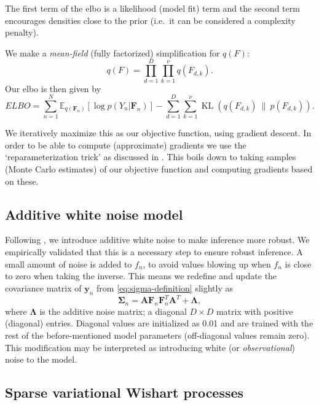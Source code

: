 The first term of the \gls{elbo} is a likelihood (model fit) term and the second term encourages densities close to the prior (i.e.~it can be considered a complexity penalty).

We make a \emph{mean-field} (fully factorized) simplification for $q(F)$:
\begin{equation}
  q(F) = \prod_{d=1}^D \prod_{k=1}^\nu q(F_{d,k}).
\end{equation}
Our \gls{elbo} is then given by
\begin{equation}
  ELBO = \sum^N_{n=1} \mathbb{E}_{q(\mathbf{F}_n)} [\log p(Y_n|\mathbf{F}_n)] - \sum^D_{d=1} \sum^\nu_{k=1} \operatorname{KL}(q(F_{d,k})~\|~p(F_{d,k})).
\end{equation}

We iteratively maximize this as our objective function, using gradient descent.
In order to be able to compute (approximate) gradients we use the `reparameterization trick' as discussed in \textcite{Salimans2013, Kingma2014}.
This boils down to taking samples (Monte Carlo estimates) of our objective function and computing gradients based on these.

\subsection{Additive white noise model}

Following \textcite{Heaukulani2019}, we introduce additive white noise to make inference more robust.
We empirically validated that this is a necessary step to ensure robust inference.
A small amount of noise is added to $f_n$, to avoid values blowing up when $f_n$ is close to zero when taking the inverse.
This means we redefine and update the covariance matrix of $\mathbf{y}_n$ from \cref{eq:sigma-definition} slightly as
\begin{equation}
  \mathbf{\Sigma}_n = \mathbf{A} \mathbf{F}_n \mathbf{F}_n^T \mathbf{A}^T + \mathbf{\Lambda},
\end{equation}
where $\mathbf{\Lambda}$ is the additive noise matrix; a diagonal $D \times D$ matrix with positive (diagonal) entries.
Diagonal values are initialized as 0.01 and are trained with the rest of the before-mentioned model parameters (off-diagonal values remain zero).
This modification may be interpreted as introducing white (or \emph{observational}) noise to the model.

\subsection{Sparse variational Wishart processes}\label{subsec:svwp}

